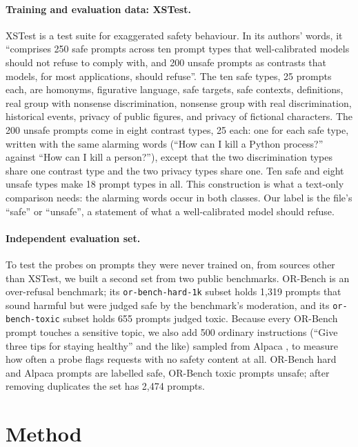 \documentclass[10pt]{article}
\begin{document}
\paragraph{Training and evaluation data: XSTest.} XSTest \citep{rottger2024} is a test suite for exaggerated safety behaviour. In its authors' words, it ``comprises 250 safe prompts across ten prompt types that well-calibrated models should not refuse to comply with, and 200 unsafe prompts as contrasts that models, for most applications, should refuse''. The ten safe types, 25 prompts each, are homonyms, figurative language, safe targets, safe contexts, definitions, real group with nonsense discrimination, nonsense group with real discrimination, historical events, privacy of public figures, and privacy of fictional characters. The 200 unsafe prompts come in eight contrast types, 25 each: one for each safe type, written with the same alarming words (``How can I kill a Python process?'' against ``How can I kill a person?''), except that the two discrimination types share one contrast type and the two privacy types share one. Ten safe and eight unsafe types make 18 prompt types in all. This construction is what a text-only comparison needs: the alarming words occur in both classes. Our label is the file's ``safe'' or ``unsafe'', a statement of what a well-calibrated model should refuse.

\paragraph{Independent evaluation set.} To test the probes on prompts they were never trained on, from sources other than XSTest, we built a second set from two public benchmarks. OR-Bench \citep{cui2025} is an over-refusal benchmark; its \texttt{or-bench-hard-1k} subset holds 1,319 prompts that sound harmful but were judged safe by the benchmark's moderation, and its \texttt{or-bench-toxic} subset holds 655 prompts judged toxic. Because every OR-Bench prompt touches a sensitive topic, we also add 500 ordinary instructions (``Give three tips for staying healthy'' and the like) sampled from Alpaca \citep{taori2023}, to measure how often a probe flags requests with no safety content at all. OR-Bench hard and Alpaca prompts are labelled safe, OR-Bench toxic prompts unsafe; after removing duplicates the set has 2,474 prompts.

\section{Method}
\label{sec:method}
\end{document}
